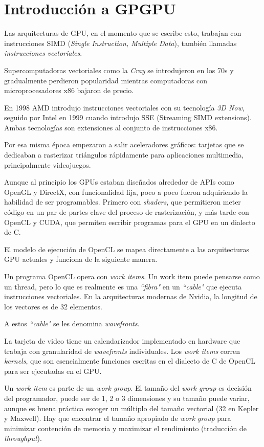 \section{Introducción a GPGPU}

Las arquitecturas de GPU, en el momento que se escribe esto, trabajan con
instrucciones SIMD (\emph{Single Instruction, Multiple Data}), también llamadas
\emph{instrucciones vectoriales}.

Supercomputadoras vectoriales como la \emph{Cray} se introdujeron en los 70s y
gradualmente perdieron popularidad mientras computadoras con microprocesadores
x86 bajaron de precio.

En 1998 AMD introdujo instrucciones vectoriales con su tecnología \emph{3D
Now}, seguido por Intel en 1999 cuando introdujo SSE (Streaming SIMD
extensions). Ambas tecnologías son extensiones al conjunto de instrucciones x86.

Por esa misma época empezaron a salir aceleradores gráficos: tarjetas que se
dedicaban a rasterizar triángulos rápidamente para aplicaciones multimedia,
principalmente videojuegos.

Aunque al principio los GPUs estaban diseñados alrededor de APIs como OpenGL y
DirectX, con funcionalidad fija, poco a poco fueron adquiriendo la habilidad de
ser programables. Primero con \emph{shaders}, que permitieron meter código en
un par de partes clave del proceso de rasterización, y más tarde con OpenCL y
CUDA, que permiten escribir programas para el GPU en un dialecto de C.

El modelo de ejecución de OpenCL se mapea directamente a las arquitecturas GPU
actuales y funciona de la siguiente manera.

Un programa OpenCL opera con \emph{work items}. Un work item puede pensarse
como un thread, pero lo que es realmente es una \emph{``fibra"} en un
\emph{``cable"} que ejecuta instrucciones vectoriales. En la arquitecturas
modernas de Nvidia, la longitud de los vectores es de 32 elementos.

A estos \emph{``cable"} se les denomina \emph{wavefronts}.

La tarjeta de video tiene un calendarizador implementado en hardware que
trabaja con granularidad de \emph{wavefronts} individuales.  Los \emph{work
items} corren \emph{kernels}, que son esencialmente funciones escritas en el
dialecto de C de OpenCL para ser ejecutadas en el GPU.

Un \emph{work item} es parte de un \emph{work group}. El tamaño del \emph{work
group} es decisión del programador, puede ser de 1, 2 o 3 dimensiones y su
tamaño puede variar, aunque es buena práctica escoger un múltiplo del tamaño
vectorial (32 en Kepler y Maxwell). Hay que encontrar el tamaño apropiado de
\emph{work group} para minimizar contención de memoria y maximizar el
rendimiento (traducción de \emph{throughput}).

